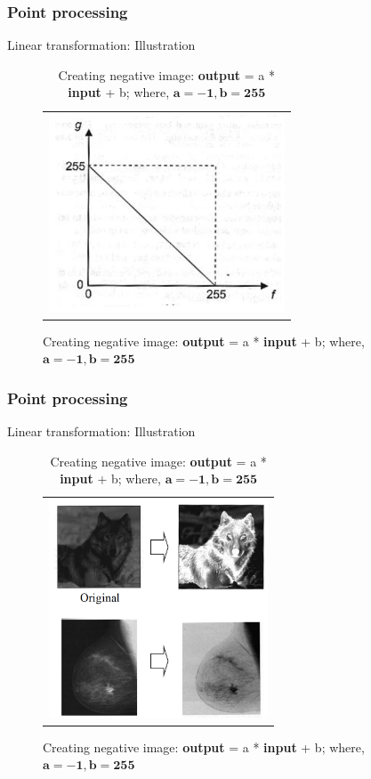 \documentclass[english,11pt,table,handout]{beamer}
\begin{document}
\begin{frame}[fragile]
\frametitle{Point processing}
\begin{block}{Linear transformation: Illustration}
	\begin{figure}[!h]
		\begin{table}
			\begin{tabular}{c}
				\includegraphics[width=7cm]{./images/linear_negative.png}
				
			\end{tabular}
			\caption{Creating negative image: \textbf{output} = a * \textbf{input} + b; where, $\mathbf{a=-1, b = 255}$}
		\end{table}
	\end{figure}	
\end{block}
\end{frame}


\begin{frame}[fragile]
\frametitle{Point processing}
\begin{block}{Linear transformation: Illustration}
	\begin{figure}[!h]
		\begin{table}
			\begin{tabular}{c}
				\includegraphics[height=6.5cm]{./images/negative_demo.png}
				
			\end{tabular}
			\caption{Creating negative image: \textbf{output} = a * \textbf{input} + b; where, $\mathbf{a=-1, b = 255}$}
		\end{table}
	\end{figure}	
\end{block}
\end{frame}
\end{document}
